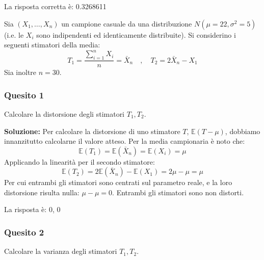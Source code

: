 \documentclass[12pt, a4paper]{article}
\begin{document}
La risposta corretta è: 0.3268611


\vspace{0.5cm}
\begin{tcolorbox}[colback=lightergray!10, colframe=tocsec, title=\textbf{Esercizio 12}]
Sia $(X_1,\dots,X_n)$ un campione casuale da una distribuzione $N(\mu=22, \sigma^2=5)$ (i.e. le $X_i$ sono indipendenti ed identicamente distribuite).
Si considerino i seguenti stimatori della media:
$$ T_1 = \frac{\sum_{i=1}^n X_i}{n} = \bar{X}_n \quad , \quad T_2 = 2\bar{X}_n - X_1 $$
Sia inoltre $n=30$.
\end{tcolorbox}

\subsubsection*{Quesito 1}
Calcolare la distorsione degli stimatori $T_1, T_2$.

\textbf{Soluzione:}
Per calcolare la distorsione di uno stimatore $T$, $\mathbb{E}(T-\mu)$, dobbiamo innanzitutto calcolarne il valore atteso.
Per la media campionaria è noto che:
$$ \mathbb{E}(T_1) = \mathbb{E}(\bar{X}_n) = \mathbb{E}(X_i) = \mu $$
Applicando la linearità per il secondo stimatore:
$$ \mathbb{E}(T_2) = 2\mathbb{E}(\bar{X}_n) - \mathbb{E}(X_1) = 2\mu - \mu = \mu $$
Per cui entrambi gli stimatori sono centrati sul parametro reale, e la loro distorsione risulta nulla: $\mu - \mu = 0$. Entrambi gli stimatori sono non distorti.

La risposta è: 0, 0

\subsubsection*{Quesito 2}
Calcolare la varianza degli stimatori $T_1, T_2$.
\end{document}

